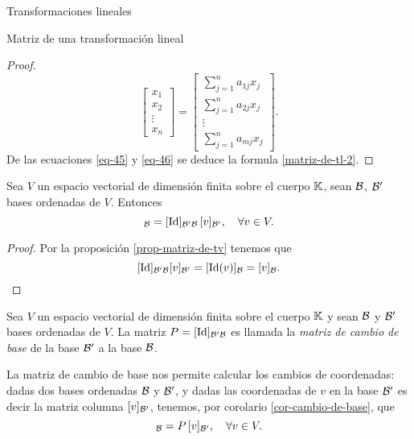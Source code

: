 \begin{chapter}{Transformaciones lineales}
\begin{section}{Matriz de una transformaci\'on lineal}
\begin{proof}
\begin{equation}
            \begin{bmatrix} x_1\\x_2\\ \vdots\\x_n\end{bmatrix}
            =
            \begin{bmatrix}  \sum_{j=1}^{n}a_{1j}x_j\\\sum_{j=1}^{n}a_{2j}x_j\\ \vdots\\\sum_{j=1}^{n}a_{mj}x_j\end{bmatrix}.
            \end{equation}
            De las ecuaciones \eqref{eq-45} y \eqref{eq-46} se deduce la formula \eqref{matriz-de-tl-2}.
        \end{proof}

        \begin{corolario}\label{cor-cambio-de-base}
            Sea $V$ un espacio vectorial de dimensión finita sobre el cuerpo $\mathbb K$, sean $\mathcal{B}$, $\mathcal{B}'$  bases ordenadas de $V$. Entonces 
            \begin{equation*}
                [v]_{\cB} = [\Id]_{\cB' \cB}\, [v]_{\cB'}, \quad \forall v \in V.
            \end{equation*}
        \end{corolario}
        \begin{proof}
            Por la proposición \ref{prop-matriz-de-tv} tenemos que 
            $$
            [\operatorname{Id}]_{\mathcal{B}' \mathcal{B}}  [v]_{\mathcal{B}'} = [\operatorname{Id} (v)]_{\mathcal{B}} = [v]_{\mathcal{B}}.
            $$
        \end{proof}

        \begin{definicion}
            Sea $V$ un espacio vectorial de dimensión finita sobre el cuerpo $\mathbb K$ y sean $\mathcal{B}$ y $\mathcal{B}'$ bases ordenadas de $V$. La matriz $P =[\operatorname{Id}]_{\mathcal{B}' \mathcal{B}}$  es llamada la \textit{matriz de cambio de base}  de la base $\mathcal{B}'$  a la base $\mathcal{B}$. 
        \end{definicion}

        La matriz de cambio de base nos permite calcular los cambios de  coordenadas: dadas dos bases ordenadas $\mathcal{B}$ y $\mathcal{B}'$,  y dadas las coordenadas de $v$ en la base  $\mathcal{B}'$ es decir la matriz columna $[v]_{\mathcal{B}'}$, tenemos, por corolario \ref{cor-cambio-de-base}, que
        \begin{equation*}
            [v]_{\cB} =P\, [v]_{\cB'}, \quad \forall v \in V.
        \end{equation*}
        

\end{section}
\end{chapter}
